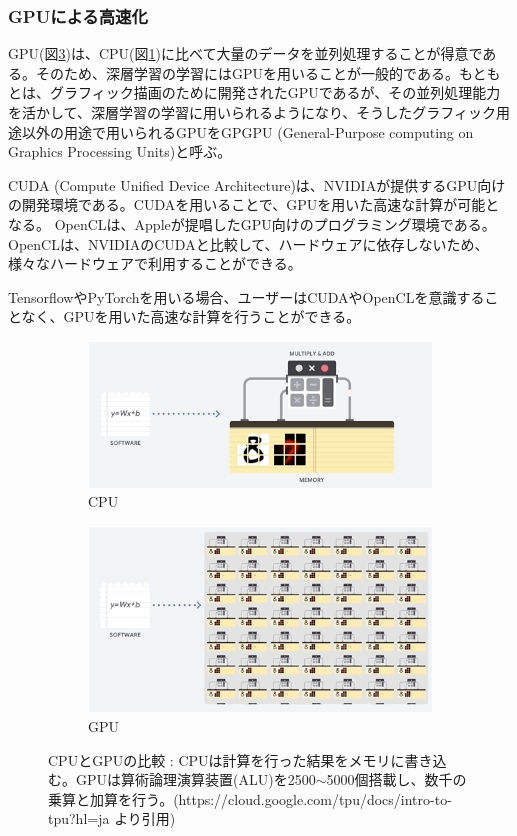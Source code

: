 \documentclass{ltjsarticle}
\begin{document}
\subsubsection{GPUによる高速化}
GPU(図\ref{fig:GPU})は、CPU(図\ref{fig:CPU})に比べて大量のデータを並列処理することが得意である。そのため、深層学習の学習にはGPUを用いることが一般的である。もともとは、グラフィック描画のために開発されたGPUであるが、その並列処理能力を活かして、深層学習の学習に用いられるようになり、そうしたグラフィック用途以外の用途で用いられるGPUをGPGPU (General-Purpose computing on Graphics Processing Units)と呼ぶ。
\par
CUDA (Compute Unified Device Architecture)は、NVIDIAが提供するGPU向けの開発環境である。CUDAを用いることで、GPUを用いた高速な計算が可能となる。
OpenCLは、Appleが提唱したGPU向けのプログラミング環境である。OpenCLは、NVIDIAのCUDAと比較して、ハードウェアに依存しないため、様々なハードウェアで利用することができる。
\par
TensorflowやPyTorchを用いる場合、ユーザーはCUDAやOpenCLを意識することなく、GPUを用いた高速な計算を行うことができる。
\begin{figure}[htbp]
  \centering
  \begin{subfigure}[b]{0.45\textwidth}
    \centering
    \includegraphics[width=\textwidth]{./capture/CPU.png}
    \caption{CPU}
    \label{fig:CPU}
  \end{subfigure}
  \hfill
  \begin{subfigure}[b]{0.45\textwidth}
    \centering
    \includegraphics[width=\textwidth]{./capture/GPU.png}
    \caption{GPU}
    \label{fig:GPU}
  \end{subfigure}
  \caption{CPUとGPUの比較 : CPUは計算を行った結果をメモリに書き込む。GPUは算術論理演算装置(ALU)を2500$\sim$5000個搭載し、数千の乗算と加算を行う。(https://cloud.google.com/tpu/docs/intro-to-tpu?hl=ja より引用)}
\end{figure}
\end{document}
